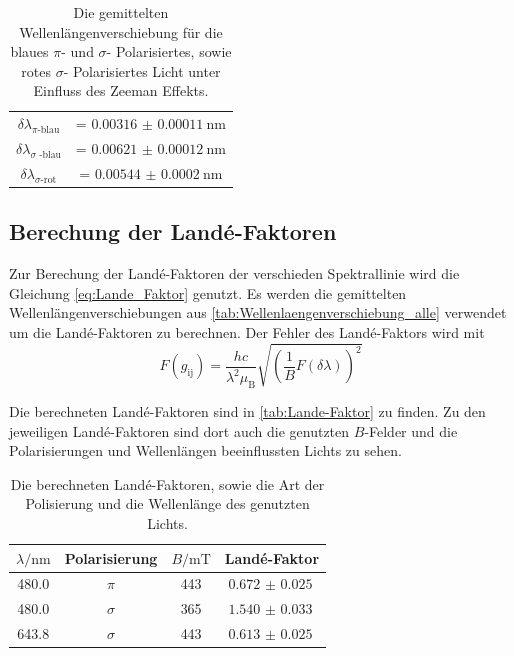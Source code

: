 \begin{table}
    \centering
    \caption{Die gemittelten Wellenlängenverschiebung für die blaues $\pi$- und $\sigma$- Polarisiertes, sowie rotes $\sigma$- Polarisiertes Licht unter Einfluss des Zeeman Effekts.}
    \begin{tabular}{cc}
        \midrule
        $\delta \lambda _\text{$\pi$-blau}$ &= $\SI{0.00316(011)}{\nano\meter}$ \\
        $\delta \lambda _\text{$\sigma$ -blau}$ &= $\SI{0.00621(012)}{\nano\meter}$ \\
        $\delta \lambda _\text{$\sigma$-rot}$ &=  $\SI{0.00544(020)}{\nano\meter}$ \\
        \bottomrule
    \end{tabular}
    \label{tab:Wellenlaengenverschiebung_alle}
\end{table}

\subsection{Berechung der Landé-Faktoren}

Zur Berechung der Landé-Faktoren der verschieden Spektrallinie wird die Gleichung \eqref{eq:Lande_Faktor} genutzt.
Es werden die gemittelten Wellenlängenverschiebungen aus \autoref{tab:Wellenlaengenverschiebung_alle} verwendet um die Landé-Faktoren zu berechnen.
Der Fehler des Landé-Faktors wird mit 
\begin{equation*}
    F(g_\text{ij}) = \frac{hc}{\lambda^2 \mu _\text{B}} \sqrt{\left ( \frac{1}{B} F(\delta \lambda) \right)^2}
\end{equation*}

Die berechneten Landé-Faktoren sind in \autoref{tab:Lande-Faktor} zu finden.
Zu den jeweiligen Landé-Faktoren sind dort auch die genutzten $B$-Felder und die Polarisierungen und Wellenlängen beeinflussten Lichts zu sehen.

\begin{table}
    \centering
    \caption{Die berechneten Landé-Faktoren, sowie die Art der Polisierung und die Wellenlänge des genutzten Lichts.}
    \begin{tabular}{cccc}
        \toprule
        $\lambda / \si{\nano\meter}$ & Polarisierung & $B / \si{\milli\tesla}$ & Landé-Faktor \\
        \midrule
        480.0 & $\pi$ & 443 & $\SI{0.672(25)}{}$ \\
        480.0 & $\sigma$ & 365 & $\SI{1.540(33)}{}$ \\
        643.8 & $\sigma$ & 443 & $\SI{0.613(25)}{}$ \\
        \bottomrule
    \end{tabular}
    \label{tab:Lande-Faktor}
\end{table}

